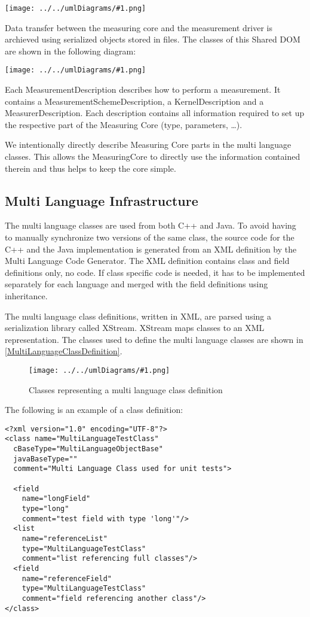 \documentclass[a4paper,12pt]{article}
\newcommand{\umlDiagram}[1]{\begin{center}\texttt{[image: ../../umlDiagrams/\#1.png]}\end{center}}
\newcommand{\umlFloat}[2]{
\begin{figure}[tbh]
\umlDiagram{#1}
\caption{#2}
\label{#1}
\end{figure}
}
\newcommand{\umlRef}[1]{\autoref{#1}}
\begin{document}
\umlDiagram{ToolComponents}

Data transfer between the measuring core and the measurement driver is archieved using serialized objects stored in files. The classes of this Shared DOM are shown in the following diagram:

\umlDiagram{MultiLanguageClasses}

Each MeasurementDescription describes how to perform a measurement. It contains a MeasurementSchemeDescription, a KernelDescription and a MeasurerDescription. Each description contains all information required to set up the respective part of the Measuring Core (type, parameters, \ldots).

We intentionally directly describe Measuring Core parts in the multi language classes. This allows the MeasuringCore to directly use the information contained therein and thus helps to keep the core simple.

\subsection{Multi Language Infrastructure}
The multi language classes are used from both C++ and Java. To avoid having to manually synchronize two versions of the same class, the source code for the C++ and the Java implementation is generated from an XML definition by the Multi Language Code Generator. The XML definition contains class and field definitions only, no code. If class specific code is needed, it has to be implemented separately for each language and merged with the field definitions using inheritance.

The multi language class definitions, written in XML, are parsed using a serialization library called XStream. XStream maps classes to an XML representation. The classes used to define the multi language classes are shown in \umlRef{MultiLanguageClassDefinition}.

\umlFloat{MultiLanguageClassDefinition}{Classes representing a multi language class definition}

The following is an example of a class definition:
\begin{verbatim}
<?xml version="1.0" encoding="UTF-8"?>
<class name="MultiLanguageTestClass" 
  cBaseType="MultiLanguageObjectBase"
  javaBaseType=""
  comment="Multi Language Class used for unit tests">

  <field 
    name="longField" 
    type="long" 
    comment="test field with type 'long'"/>
  <list  
    name="referenceList" 
    type="MultiLanguageTestClass" 
    comment="list referencing full classes"/>
  <field 
    name="referenceField" 
    type="MultiLanguageTestClass" 
    comment="field referencing another class"/>
</class>
\end{verbatim}
\end{document}
